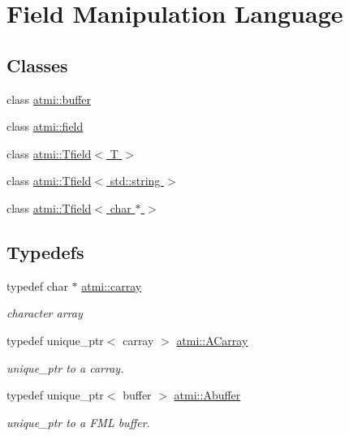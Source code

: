 \hypertarget{group__fml}{}\section{Field Manipulation Language}
\label{group__fml}
\subsection*{Classes}
\begin{DoxyCompactItemize}
\item 
class \hyperlink{classatmi_1_1buffer}{atmi\+::buffer}
\item 
class \hyperlink{classatmi_1_1field}{atmi\+::field}
\item 
class \hyperlink{classatmi_1_1_tfield}{atmi\+::\+Tfield$<$ T $>$}
\item 
class \hyperlink{classatmi_1_1_tfield_3_01std_1_1string_01_4}{atmi\+::\+Tfield$<$ std\+::string $>$}
\item 
class \hyperlink{classatmi_1_1_tfield_3_01char_01_5_01_4}{atmi\+::\+Tfield$<$ char $\ast$ $>$}
\end{DoxyCompactItemize}
\subsection*{Typedefs}
\begin{DoxyCompactItemize}
\item 
typedef char $\ast$ \hyperlink{group__fml_ga8b57f9a4e2453d8e5d82ac0016e35e87}{atmi\+::carray}\hypertarget{group__fml_ga8b57f9a4e2453d8e5d82ac0016e35e87}{}\label{group__fml_ga8b57f9a4e2453d8e5d82ac0016e35e87}

\begin{DoxyCompactList}\small\item\em character array \end{DoxyCompactList}\item 
typedef unique\+\_\+ptr$<$ carray $>$ \hyperlink{group__fml_ga374230d2a2355a879f42c829eb2d70ff}{atmi\+::\+A\+Carray}\hypertarget{group__fml_ga374230d2a2355a879f42c829eb2d70ff}{}\label{group__fml_ga374230d2a2355a879f42c829eb2d70ff}

\begin{DoxyCompactList}\small\item\em unique\+\_\+ptr to a carray. \end{DoxyCompactList}\item 
typedef unique\+\_\+ptr$<$ buffer $>$ \hyperlink{group__fml_ga268bae34ffaa2c2e72fabbcb54841934}{atmi\+::\+Abuffer}\hypertarget{group__fml_ga268bae34ffaa2c2e72fabbcb54841934}{}\label{group__fml_ga268bae34ffaa2c2e72fabbcb54841934}

\begin{DoxyCompactList}\small\item\em unique\+\_\+ptr to a F\+ML buffer. \end{DoxyCompactList}\end{DoxyCompactItemize}
